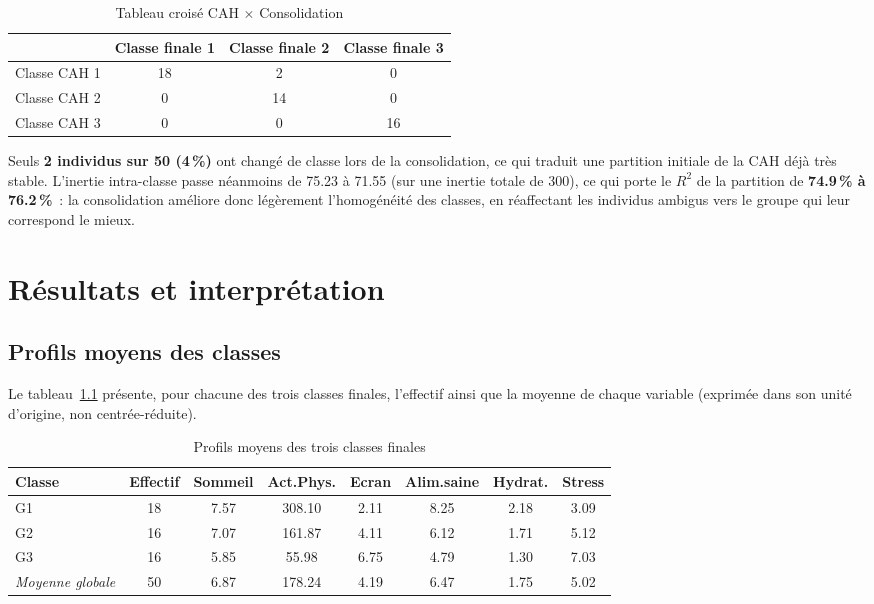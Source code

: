 \documentclass[11pt,a4paper,oneside]{book}
\begin{document}
\begin{table}[h!]
\centering
\caption{Tableau croisé CAH $\times$ Consolidation}
\label{tab:croise}
\begin{tabular}{@{}lccc@{}}
\toprule
 & \textbf{Classe finale 1} & \textbf{Classe finale 2} & \textbf{Classe finale 3} \\
\midrule
Classe CAH 1 & 18 & 2 & 0 \\
Classe CAH 2 & 0  & 14 & 0 \\
Classe CAH 3 & 0  & 0  & 16 \\
\bottomrule
\end{tabular}
\end{table}

Seuls \textbf{2 individus sur 50 (4\,\%)} ont changé de classe lors de la consolidation, ce qui traduit une partition initiale de la CAH déjà très stable. L'inertie intra-classe passe néanmoins de 75.23 à 71.55 (sur une inertie totale de 300), ce qui porte le $R^2$ de la partition de \textbf{74.9\,\% à 76.2\,\%}~: la consolidation améliore donc légèrement l'homogénéité des classes, en réaffectant les individus ambigus vers le groupe qui leur correspond le mieux.

\chapter{Résultats et interprétation}

\section{Profils moyens des classes}

Le tableau~\ref{tab:profils} présente, pour chacune des trois classes finales, l'effectif ainsi que la moyenne de chaque variable (exprimée dans son unité d'origine, non centrée-réduite).

\begin{table}[h!]
\centering
\caption{Profils moyens des trois classes finales}
\label{tab:profils}
\begin{tabular}{@{}lccccccc@{}}
\toprule
\textbf{Classe} & \textbf{Effectif} & \textbf{Sommeil} & \textbf{Act.Phys.} & \textbf{Ecran} & \textbf{Alim.saine} & \textbf{Hydrat.} & \textbf{Stress} \\
\midrule
G1 & 18 & 7.57 & 308.10 & 2.11 & 8.25 & 2.18 & 3.09 \\
G2 & 16 & 7.07 & 161.87 & 4.11 & 6.12 & 1.71 & 5.12 \\
G3 & 16 & 5.85 & 55.98  & 6.75 & 4.79 & 1.30 & 7.03 \\
\midrule
\textit{Moyenne globale} & 50 & 6.87 & 178.24 & 4.19 & 6.47 & 1.75 & 5.02 \\
\bottomrule
\end{tabular}
\end{table}
\end{document}
